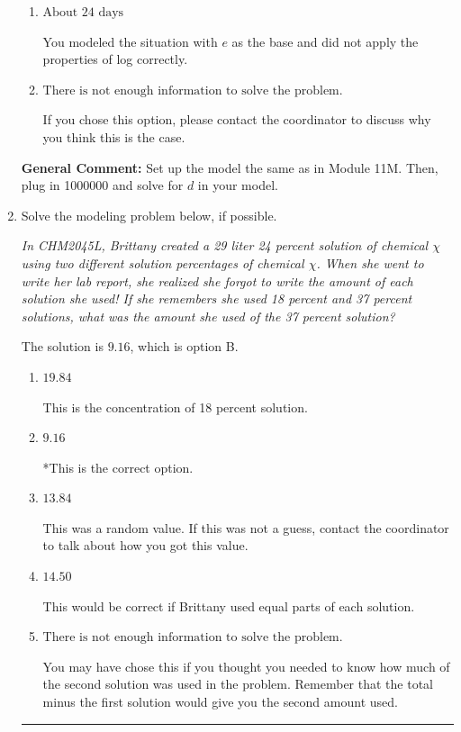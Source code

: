 \documentclass{extbook}[14pt]
\newcommand{\litem}[1]{\item #1

\rule{\textwidth}{0.4pt}}
\begin{document}
\begin{enumerate}
{\begin{enumerate}[label=\Alph*.]
You modeled the situation correctly but did not apply the properties of log correctly.
\item \( \text{About } 24 \text{ days} \)

You modeled the situation with $e$ as the base and did not apply the properties of log correctly.
\item \( \text{There is not enough information to solve the problem.} \)

If you chose this option, please contact the coordinator to discuss why you think this is the case.
\end{enumerate}

\textbf{General Comment:} Set up the model the same as in Module 11M. Then, plug in 1000000 and solve for $d$ in your model.
}
\litem{
Solve the modeling problem below, if possible.

\begin{center}
    \textit{ In CHM2045L, Brittany created a 29 liter 24 percent solution of chemical $\chi$ using two different solution percentages of chemical $\chi$. When she went to write her lab report, she realized she forgot to write the amount of each solution she used! If she remembers she used 18 percent and 37 percent solutions, what was the amount she used of the 37 percent solution? }
\end{center}


The solution is \( 9.16 \), which is option B.\begin{enumerate}[label=\Alph*.]
\item \( 19.84 \)

This is the concentration of 18 percent solution.
\item \( 9.16 \)

*This is the correct option.
\item \( 13.84 \)

This was a random value. If this was not a guess, contact the coordinator to talk about how you got this value.
\item \( 14.50 \)

This would be correct if Brittany used equal parts of each solution.
\item \( \text{There is not enough information to solve the problem.} \)

You may have chose this if you thought you needed to know how much of the second solution was used in the problem. Remember that the total minus the first solution would give you the second amount used.
\end{enumerate}

}
\end{enumerate}
\end{document}
